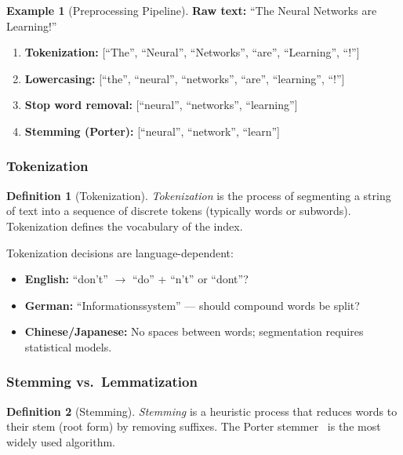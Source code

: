 \documentclass[aspectratio=169]{beamer} \usetheme{TUDelft} %
\theoremstyle{definition}
\newtheorem{definition}{Definition}[section]
\newtheorem{example}{Example}[section]
\theoremstyle{plain}
\begin{document}
\begin{example}[Preprocessing Pipeline]
\label{ex:preprocessing}
\textbf{Raw text:} ``The Neural Networks are Learning!''
\begin{enumerate}
    \item \textbf{Tokenization:} [``The'', ``Neural'', ``Networks'', ``are'', ``Learning'', ``!'']
    \item \textbf{Lowercasing:} [``the'', ``neural'', ``networks'', ``are'', ``learning'', ``!'']
    \item \textbf{Stop word removal:} [``neural'', ``networks'', ``learning'']
    \item \textbf{Stemming (Porter):} [``neural'', ``network'', ``learn'']
\end{enumerate}
\end{example}


\subsubsection{Tokenization}

\begin{definition}[Tokenization]
\label{def:tokenization}
\emph{Tokenization} is the process of segmenting a string of text into a sequence of discrete tokens (typically words or subwords). Tokenization defines the vocabulary of the index.
\end{definition}

Tokenization decisions are language-dependent:
\begin{itemize}
    \item \textbf{English:} ``don't'' $\to$ ``do'' + ``n't'' or ``dont''?
    \item \textbf{German:} ``Informationssystem'' --- should compound words be split?
    \item \textbf{Chinese/Japanese:} No spaces between words; segmentation requires statistical models.
\end{itemize}


\subsubsection{Stemming vs.\ Lemmatization}

\begin{definition}[Stemming]
\label{def:stemming}
\emph{Stemming} is a heuristic process that reduces words to their stem (root form) by removing suffixes. The Porter stemmer~\cite{porter1980algorithm} is the most widely used algorithm.
\end{definition}
\end{document}
